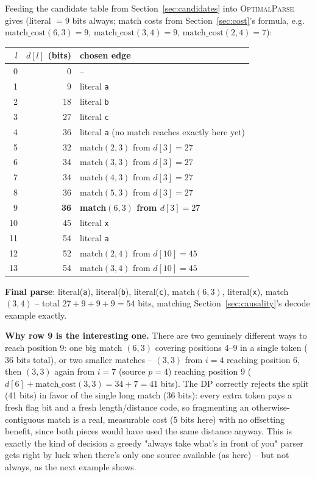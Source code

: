 \documentclass[11pt]{article}
\begin{document}
\begin{tcolorbox}[colback=green!5!white,colframe=green!45!black,title=Worked example: the full DP table for $S$]
Feeding the candidate table from Section~\ref{sec:candidates} into
\textsc{OptimalParse} gives (literal $=9$ bits always; match costs from
Section~\ref{sec:cost}'s formula, e.g.\ $\text{match\_cost}(6,3)=9$,
$\text{match\_cost}(3,4)=9$, $\text{match\_cost}(2,4)=7$):
\begin{center}
\begin{tabular}{@{}rrl@{}}
\toprule
$l$ & $d[l]$ (bits) & chosen edge \\
\midrule
0 & 0 & -- \\
1 & 9 & literal \texttt{a} \\
2 & 18 & literal \texttt{b} \\
3 & 27 & literal \texttt{c} \\
4 & 36 & literal \texttt{a} (no match reaches exactly here yet) \\
5 & 32 & match$(2,3)$ from $d[3]=27$ \\
6 & 34 & match$(3,3)$ from $d[3]=27$ \\
7 & 34 & match$(4,3)$ from $d[3]=27$ \\
8 & 36 & match$(5,3)$ from $d[3]=27$ \\
9 & \textbf{36} & \textbf{match$(6,3)$ from $d[3]=27$} \\
10 & 45 & literal \texttt{x} \\
11 & 54 & literal \texttt{a} \\
12 & 52 & match$(2,4)$ from $d[10]=45$ \\
13 & 54 & match$(3,4)$ from $d[10]=45$ \\
\bottomrule
\end{tabular}
\end{center}
\textbf{Final parse}: literal(\texttt{a}), literal(\texttt{b}), literal(\texttt{c}),
match$(6,3)$, literal(\texttt{x}), match$(3,4)$ -- total $27 + 9 + 9 + 9 = 54$ bits,
matching Section~\ref{sec:causality}'s decode example exactly.

\textbf{Why row 9 is the interesting one.} There are two genuinely different ways to
reach position 9: one big match $(6,3)$ covering positions 4--9 in a single token
($36$ bits total), or two smaller matches -- $(3,3)$ from $i{=}4$ reaching position 6,
then $(3,3)$ again from $i{=}7$ (source $p{=}4$) reaching position 9
($d[6] + \text{match\_cost}(3,3) = 34 + 7 = 41$ bits). The DP correctly rejects the
split (41 bits) in favor of the single long match (36 bits): every extra token pays a
fresh flag bit and a fresh length/distance code, so fragmenting an otherwise-contiguous
match is a real, measurable cost (5 bits here) with no offsetting benefit, since both
pieces would have used the same distance anyway. This is exactly the kind of decision a
greedy "always take what's in front of you" parser gets right by luck when there's only
one source available (as here) -- but not always, as the next example shows.
\end{tcolorbox}
\end{document}
